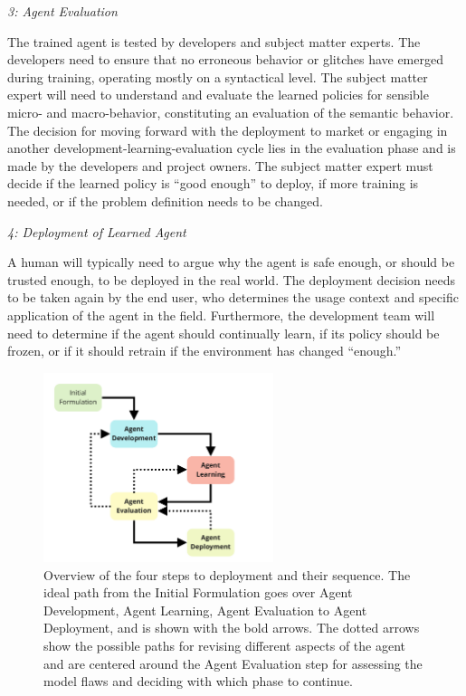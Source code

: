 \documentclass[twoside,11pt]{article}
\begin{document}
\emph{3: Agent Evaluation}

The trained agent is tested by developers and subject matter experts.
The developers need to ensure that no erroneous behavior or glitches have emerged during training, operating mostly on a syntactical level. The subject matter expert will need to understand and evaluate the learned policies for sensible micro- and macro-behavior, constituting an evaluation of the semantic behavior. The decision for moving forward with the deployment to market or engaging in another development-learning-evaluation cycle lies in the evaluation phase and is made by the developers and project owners. The subject matter expert must decide if the learned policy is ``good enough'' to deploy, if more training is needed, or if the problem definition needs to be changed. 
\vspace{2mm}

\emph{4: Deployment of Learned Agent}

A human will typically need to argue why the agent is safe enough, or should be trusted enough, to be deployed in the real world. The deployment decision needs to be taken again by the end user, who determines the usage context and specific application of the agent in the field. Furthermore, the development team will need to determine if the agent should continually learn, if its policy should be frozen, or if it should retrain if the environment has changed ``enough.'' 
\vspace{2mm}

\begin{figure}[h]
    \centering
    \includegraphics[width=0.6\textwidth]{img/HITL Deployment Workflow.pdf}
    \caption{Overview of the four steps to deployment and their sequence. The ideal path from the Initial Formulation goes over Agent Development, Agent Learning, Agent Evaluation to Agent Deployment, and is shown with the bold arrows. The dotted arrows show the possible paths for revising different aspects of the agent and are centered around the Agent Evaluation step for assessing the model flaws and deciding with which phase to continue.}
    \label{fig:Deployment_Workflow}
\end{figure}
\end{document}
